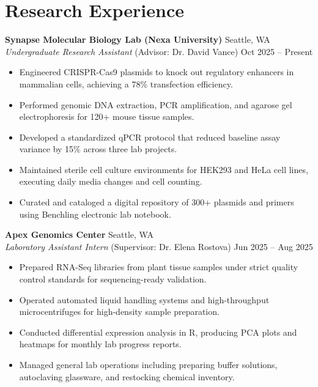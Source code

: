 \documentclass[10pt,letterpaper]{article}
\begin{document}
\section*{Research Experience}
\noindent
\textbf{Synapse Molecular Biology Lab (Nexa University)} \hfill Seattle, WA \\
\textit{Undergraduate Research Assistant} (Advisor: Dr. David Vance) \hfill Oct 2025 -- Present
\begin{itemize}
    \item Engineered CRISPR-Cas9 plasmids to knock out regulatory enhancers in mammalian cells, achieving a 78\% transfection efficiency.
    \item Performed genomic DNA extraction, PCR amplification, and agarose gel electrophoresis for 120+ mouse tissue samples.
    \item Developed a standardized qPCR protocol that reduced baseline assay variance by 15\% across three lab projects.
    \item Maintained sterile cell culture environments for HEK293 and HeLa cell lines, executing daily media changes and cell counting.
    \item Curated and cataloged a digital repository of 300+ plasmids and primers using Benchling electronic lab notebook.
\end{itemize}

\vspace{8pt}

\noindent
\textbf{Apex Genomics Center} \hfill Seattle, WA \\
\textit{Laboratory Assistant Intern} (Supervisor: Dr. Elena Rostova) \hfill Jun 2025 -- Aug 2025
\begin{itemize}
    \item Prepared RNA-Seq libraries from plant tissue samples under strict quality control standards for sequencing-ready validation.
    \item Operated automated liquid handling systems and high-throughput microcentrifuges for high-density sample preparation.
    \item Conducted differential expression analysis in R, producing PCA plots and heatmaps for monthly lab progress reports.
    \item Managed general lab operations including preparing buffer solutions, autoclaving glassware, and restocking chemical inventory.
\end{itemize}

\end{document}
